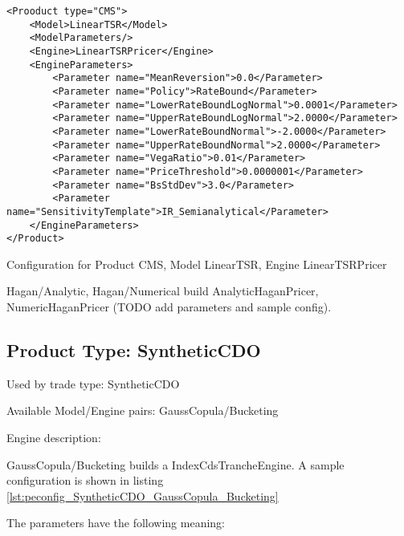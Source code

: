 \begin{longlisting}
\begin{verbatim}
<Prooduct type="CMS">
    <Model>LinearTSR</Model>
    <ModelParameters/>
    <Engine>LinearTSRPricer</Engine>
    <EngineParameters>
        <Parameter name="MeanReversion">0.0</Parameter>
        <Parameter name="Policy">RateBound</Parameter>
        <Parameter name="LowerRateBoundLogNormal">0.0001</Parameter>
        <Parameter name="UpperRateBoundLogNormal">2.0000</Parameter>
        <Parameter name="LowerRateBoundNormal">-2.0000</Parameter>
        <Parameter name="UpperRateBoundNormal">2.0000</Parameter>
        <Parameter name="VegaRatio">0.01</Parameter>
        <Parameter name="PriceThreshold">0.0000001</Parameter>
        <Parameter name="BsStdDev">3.0</Parameter>
        <Parameter name="SensitivityTemplate">IR_Semianalytical</Parameter>
    </EngineParameters>
</Product>
\end{verbatim}
\caption{Configuration for Product CMS, Model LinearTSR, Engine LinearTSRPricer}
\label{lst:peconfig_CMS_LinearTSR_LinearTSRPricer}
\end{longlisting}

Hagan/Analytic, Hagan/Numerical build AnalyticHaganPricer, NumericHaganPricer (TODO add parameters and sample config).

\subsection{Product Type: SyntheticCDO}

Used by trade type: SyntheticCDO

Available Model/Engine pairs: GaussCopula/Bucketing

Engine description:

GaussCopula/Bucketing builds a IndexCdsTrancheEngine. A sample configuration is shown in listing
\ref{lst:peconfig_SyntheticCDO_GaussCopula_Bucketing}

The parameters have the following meaning:

